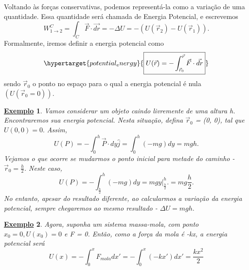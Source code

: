 \documentclass{article}
\newtheorem{example}{\underline{Exemplo}}
\begin{document}
  Voltando às for\c cas conservativas, podemos representá-la como a varia\c cão de uma quantidade.
  Essa quantidade será chamada de Energia Potencial, e escrevemos 
    \[
      W_{1\rightarrow2}^{C} = \int_{C}^{}\vec{F}\cdot \vec{dr} = -\Delta U = -(U(\vec{r}_{2}) - U(\vec{r}_{1})).
    \]
    Formalmente, iremos definir a energia potencial como 
      \[
      \hypertarget{potential_energy}{\boxed{U(\vec{r}) = -\int_{\vec{r}_{0}}^{\vec{r}}\vec{F}\cdot \vec{dr}}}
      \]
      sendo \(\vec{r}_{0}\) o ponto no espa\c co para o qual a energia potencial é nula \((U(\vec{r}_{0} = 0))\).
     \begin{example}
       Vamos considerar um objeto caindo livremente de uma altura h. Encontraremos sua energia potencial.
       Nesta situa\c cão, defina \(\vec{r}_{0}\) = (0, 0), tal que \(U(0, 0) = 0.\) Assim,
       \[
        U(P) = -\int_{0}^{h}\vec{P}\cdot dy\hat{j} = \int_{0}^{h}(-mg)dy = mgh.
      \]
      Vejamos o que ocorre se mudarmos o ponto inicial para metade do caminho - \(\vec{r}_{0} = \frac{h}{2}\). Neste caso,  
        \[
          U(P) = -\int_{\frac{h}{2}}^{h}(-mg)dy = mgy \biggl|_{\frac{h}{2}}^{h}\biggr. = mg \frac{h}{2}.
        \]
      No entanto, apesar do resultado diferente, ao calcularmos a varia\c cão da energia potencial,
      sempre chegaremos ao mesmo resultado - \(\Delta U = mgh.\)
     \end{example}
    \begin{example}
      Agora, suponha um sistema massa-mola, com ponto \(x_{0} = 0, U(x_{0}) = 0\)
      e F = 0. Então, como a for\c ca da mola é -kx, a energia potencial será 
        \[
          U(x) = -\int_{0}^{x}F_{mola}dx'= - \int_{0}^{x}(-kx')dx' = \frac{kx^{2}}{2}
        \]
    \end{example} 
      
\end{document}
